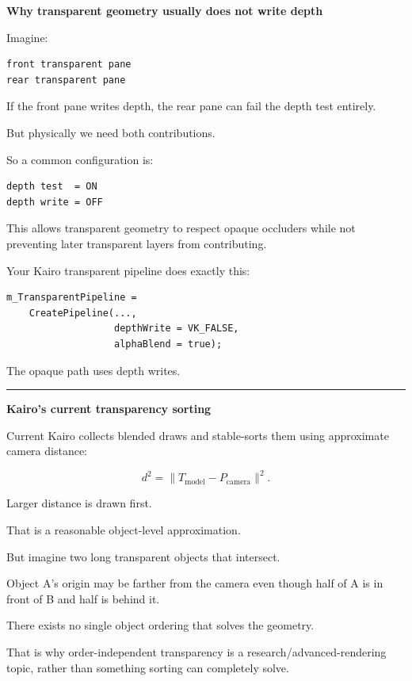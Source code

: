 \textbf{Why transparent geometry usually does not write depth}

Imagine:

\begin{verbatim}
front transparent pane
rear transparent pane
\end{verbatim}

If the front pane writes depth, the rear pane can fail the depth test entirely.

But physically we need both contributions.

So a common configuration is:

\begin{verbatim}
depth test  = ON
depth write = OFF
\end{verbatim}

This allows transparent geometry to respect opaque occluders while not preventing later transparent layers from contributing.

Your Kairo transparent pipeline does exactly this:

\begin{verbatim}
m_TransparentPipeline =
    CreatePipeline(...,
                   depthWrite = VK_FALSE,
                   alphaBlend = true);
\end{verbatim}

The opaque path uses depth writes.

\begin{center}\rule{0.5\linewidth}{0.5pt}\end{center}

\textbf{Kairo's current transparency sorting}

Current Kairo collects blended draws and stable-sorts them using approximate camera distance:

\[
d^2=\|T_{\text{model}}-P_{\text{camera}}\|^2.
\]

Larger distance is drawn first.

That is a reasonable object-level approximation.

But imagine two long transparent objects that intersect.

Object A's origin may be farther from the camera even though half of A is in front of B and half is behind it.

There exists no single object ordering that solves the geometry.

That is why order-independent transparency is a research/advanced-rendering topic, rather than something sorting can completely solve.

